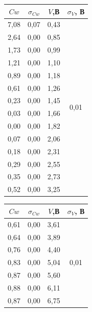\documentclass[a4paper,12pt]{report}
\begin{document}
\begin{table}[H]
\begin{tabular}{|c|c|c|c|}
\hline
$Cw$   & $\sigma_{Cw}$ & $V$,В  & $\sigma_V$, В          \\ \hline
7,08 & 0,07    & 0,43 & \multirow{14}{*}{0,01} \\ \cline{1-3}
2,64 & 0,00    & 0,85 &                        \\ \cline{1-3}
1,73 & 0,00    & 0,99 &                        \\ \cline{1-3}
1,21 & 0,00    & 1,10 &                        \\ \cline{1-3}
0,89 & 0,00    & 1,18 &                        \\ \cline{1-3}
0,61 & 0,00    & 1,26 &                        \\ \cline{1-3}
0,23 & 0,00    & 1,45 &                        \\ \cline{1-3}
0,03 & 0,00    & 1,66 &                        \\ \cline{1-3}
0,00 & 0,00    & 1,82 &                        \\ \cline{1-3}
0,07 & 0,00    & 2,06 &                        \\ \cline{1-3}
0,18 & 0,00    & 2,31 &                        \\ \cline{1-3}
0,29 & 0,00    & 2,55 &                        \\ \cline{1-3}
0,35 & 0,00    & 2,73 &                        \\ \cline{1-3}
0,52 & 0,00    & 3,25 &                        \\ \hline
\end{tabular}
\hspace{1cm}
\begin{tabular}{|c|c|c|c|}
\hline
$Cw$   & $\sigma_{Cw}$ & $V$,В  & $\sigma_V$, В   \\ \hline
0,61 & 0,00    & 3,61  & \multirow{14}{*}{0,01} \\ \cline{1-3}
0,64 & 0,00    & 3,89  &                        \\ \cline{1-3}
0,76 & 0,00    & 4,40  &                        \\ \cline{1-3}
0,83 & 0,00    & 5,04  &                        \\ \cline{1-3}
0,87 & 0,00    & 5,60  &                        \\ \cline{1-3}
0,88 & 0,00    & 6,11  &                        \\ \cline{1-3}
0,87 & 0,00    & 6,75  &                        \\ \cline{1-3}

\end{tabular}
\end{table}
\end{document}
